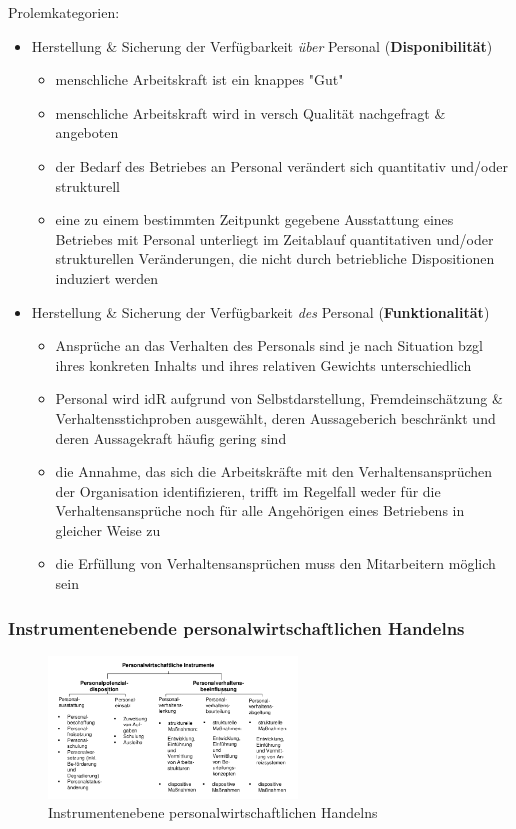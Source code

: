 \documentclass[11pt]{article}
\begin{document}
Prolemkategorien:
\begin{itemize}
\item Herstellung \& Sicherung der Verfügbarkeit \emph{über} Personal (\textbf{Disponibilität})
\begin{itemize}
\item menschliche Arbeitskraft ist ein knappes "Gut"
\item menschliche Arbeitskraft wird in versch Qualität nachgefragt \& angeboten
\item der Bedarf des Betriebes an Personal verändert sich quantitativ und/oder strukturell
\item eine zu einem bestimmten Zeitpunkt gegebene Ausstattung eines Betriebes mit Personal unterliegt im Zeitablauf quantitativen und/oder strukturellen Veränderungen, die nicht durch betriebliche Dispositionen induziert werden
\end{itemize}
\item Herstellung \& Sicherung der Verfügbarkeit \emph{des} Personal (\textbf{Funktionalität})
\begin{itemize}
\item Ansprüche an das Verhalten des Personals sind je nach Situation bzgl ihres konkreten Inhalts und ihres relativen Gewichts unterschiedlich
\item Personal wird idR aufgrund von Selbstdarstellung, Fremdeinschätzung \& Verhaltensstichproben ausgewählt, deren Aussageberich beschränkt und deren Aussagekraft häufig gering sind
\item die Annahme, das sich die Arbeitskräfte mit den Verhaltensansprüchen der Organisation identifizieren, trifft im Regelfall weder für die Verhaltensansprüche noch für alle Angehörigen eines Betriebens in gleicher Weise zu
\item die Erfüllung von Verhaltensansprüchen muss den Mitarbeitern möglich sein
\end{itemize}
\end{itemize}

\subsubsection{Instrumentenebende personalwirtschaftlichen Handelns}
\label{sec:org92ff445}
\begin{figure}[htbp]
\centering
\includegraphics[width=250px]{./pictures/persinstr.png}
\caption{Instrumentenebene personalwirtschaftlichen Handelns}
\end{figure} 
\end{document}
